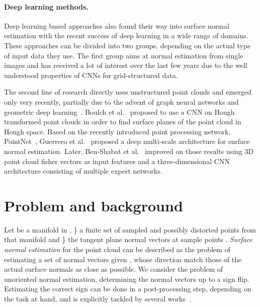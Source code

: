 \documentclass[10pt,twocolumn,letterpaper]{article}
\begin{document}
\paragraph{Deep learning methods.} Deep learning based approaches also found their
way into surface normal estimation with the recent success of deep learning in a wide
range of domains. These approaches can be divided into two groups, depending on
the actual type of input data they use. The first group aims at normal estimation 
from single images \cite{Bansal:2016, Eigen:2015, Fouhey:2013, Ladicky:2014, Li:2015, Qi:2018, Wang:2015} and has received a lot of interest over the last few years due to the well understood properties of CNNs for grid-structured data.


The second line of research
directly uses unstructured point clouds and emerged only 
very recently, partially due to the advent of graph neural networks
and geometric deep learning~\cite{BronsteinGDLSurvey:2017}.
Boulch et al.~\cite{Boulch:2016} proposed to use a CNN on
Hough transformed point clouds in order to find surface planes of the
point cloud in Hough space. 
Based on the recently introduced point processing network, 
PointNet~\cite{Qi:2017}, Guerrero et al.~\cite{Guerrero:2018} proposed a 
deep multi-scale architecture for surface normal estimation. 
Later, Ben-Shabat et al.~\cite{Ben-Shabat:2018} improved on those results
using 3D point cloud fisher vectors as input features and a three-dimensional CNN
architecture consisting of multiple expert networks.







\section{Problem and background}
Let  be a manifold in , \} a finite set of sampled and possibly distorted points from that manifold and \} the tangent plane normal vectors at sample points . \emph{Surface normal estimation} for the point cloud  can be described as the problem of estimating a set of normal vectors  given , whose direction match those of the actual surface normals  as close as possible. We consider the problem of unoriented normal estimation, determining the normal vectors up to a sign flip. Estimating the correct sign can be done in a post-processing step, depending on the task at hand, and is explicitly tackled by several works~\cite{Mullen:2010, Huang:2019, Wu:2015}.
\end{document}
